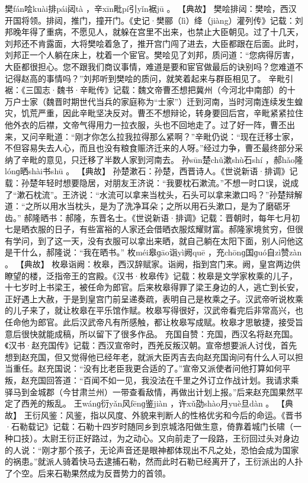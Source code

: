 \documentclass[12pt,UTF8]{ctexbook}
\begin{document}
樊fán哙kuài排pái闼tà
，辛xīn毗pí引yǐn裾jū
。
【典故】
樊哙排闼：樊哙，西汉开国将领。排闼，推门，撞开门。《史记·樊郦（lì）绛（jiàng）灌列传》记载：刘邦晚年得了重病，不愿见人，就躲在宫里不出来，也禁止大臣朝见。过了十几天，刘邦还不肯露面，大将樊哙着急了，推开宫门闯了进去，大臣都跟在后面。此时，刘邦正一个人躺在床上，枕着一个宦官。樊哙见了刘邦，质问道：“您病得厉害，大臣都很担心。您不跟我们商议事情，难道是要和宦官做最后的诀别吗？您难道不记得赵高的事情吗？”刘邦听到樊哙的质问，就笑着起来与群臣相见了。
辛毗引裾：《三国志·魏书·辛毗传》记载：魏文帝曹丕想把冀州（今河北中南部）的十万户士家（魏晋时期世代当兵的家庭称为“士家”）迁到河南，当时河南连续发生蝗灾，饥荒严重，因此辛毗坚决反对。曹丕不想辩论，转身要回后宫，辛毗紧紧拉住他外衣的后襟，文帝气得用力一拉衣服，头也不回地走了。过了好一阵，曹丕出来，又问辛毗道：“刚才你怎么拉我拉得那么紧啊？”辛毗仍说：“现在迁移士家，不但容易失去人心，而且也没有粮食赈济迁来的人呀。”经过力争，曹丕最终部分采纳了辛毗的意见，只迁移了半数人家到河南去。
孙sūn楚chǔ漱shù石shí
，郝hǎo隆lónɡ晒shài书shū
。
【典故】
孙楚漱石：孙楚，西晋诗人。《世说新语·排调》记载：孙楚年轻时想要隐居，对朋友王济说：“我要枕石漱流。”不想一时口误，说成了“漱石枕流”。王济说：“水流可以拿来当枕头，石头可以拿来漱口吗？”孙楚辩解道：“之所以用水当枕头，是为了洗净耳朵；之所以用石头漱口，是为了磨砺牙齿。”
郝隆晒书：郝隆，东晋名士。《世说新语·排调》记载：晋朝时，每年七月初七是晒衣服的日子，有些富裕的人家还会借晒衣服炫耀财富。郝隆家境贫穷，但很有学问，到了这一天，没有衣服可以拿出来晒，就自己躺在太阳下面，别人问他这是干什么，郝隆说：“我在晒书。”
枚méi皋ɡāo诣yì阙quē
，充chōnɡ国ɡuó自zì赞zàn
。
【典故】
枚皋诣阙：枚皋，西汉辞赋家。诣阙，指到宫门来。阙，皇宫两边供瞭望的楼，泛指帝王的宫殿。《汉书·枚皋传》记载：枚皋是文学家枚乘的儿子，十七岁时上书梁王，被任命为郎官。后来枚皋得罪了梁王身边的人，逃亡到长安，正好遇上大赦，于是到皇宫门前呈递奏疏，表明自己是枚乘之子。汉武帝听说枚乘的儿子来了，就让枚皋在平乐馆作赋。枚皋写得很好，汉武帝看完后非常高兴，也任命他为郎官。此后汉武帝凡有所感触，都让枚皋写成赋。枚皋才思敏捷，接受旨意后很快就能成稿，所以留下了很多作品。
充国自赞：充国，西汉名将赵充国。《汉书·赵充国传》记载：西汉宣帝时，西羌反叛汉朝。宣帝想要派人讨伐，首先想到赵充国，但又觉得他已经年老，就派大臣丙吉去向赵充国询问有什么人可以担当重任。赵充国说：“没有比老臣我更合适的了。”宣帝又派使者问他打算如何平叛，赵充国回答道：“百闻不如一见，我没法在千里之外订立作战计划。我请求乘驿马到金城郡（今甘肃兰州）一带查看敌情，再做出计划上报。”后来赵充国果然平定了西羌的叛乱。
王wánɡ衍yǎn风fēnɡ鉴jiàn
，许xǔ劭shào月yuè旦dàn
。
【典故】
王衍风鉴：风鉴，指以风度、外貌来判断人的性格优劣和今后的命运。《晋书·石勒载记》记载：石勒十四岁时随同乡到京城洛阳做生意，倚靠着城门长啸（一种口技）。太尉王衍正好路过，为之动心。又向前走了一段路，王衍回过头对身边的人说：“刚才那个孩子，无论声音还是眼神都体现出不凡之处，恐怕会成为国家的祸患。”就派人骑着快马去逮捕石勒，然而此时石勒已经离开了，王衍派出的人扑了个空。后来石勒果然成为反晋势力的首领。
\end{document}
